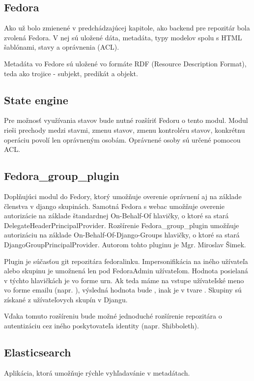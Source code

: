 \documentclass[thesis=M,slovak]{FITthesis}[2013/05/06]
\begin{document}
\subsection{Fedora}
Ako už bolo zmienené v predchádzajúcej kapitole, ako backend pre repozitár bola zvolená Fedora. V nej sú uložené dáta, metadáta, typy modelov spolu s HTML šablónami, stavy a oprávnenia (ACL).

Metadáta vo Fedore sú uložené vo formáte RDF (Resource Description Format), teda ako trojice - subjekt, predikát a objekt.

\subsection{State engine}
Pre možnosť využívania stavov bude nutné rozšíriť Fedoru o tento modul. Modul rieši prechody medzi stavmi, zmenu stavov, zmenu kontroléru stavov, konkrétnu operáciu povolí len oprávneným osobám. Oprávnené osoby sú určené pomocou ACL.

\subsection{Fedora\_group\_plugin}
Doplňujúci modul do Fedory, ktorý umožňuje overenie oprávnení aj na základe členstva v django skupinách. Samotná Fedora s webac umožňuje overenie autorizácie na základe štandardnej On-Behalf-Of hlavičky, o ktoré sa stará DelegateHeaderPrincipalProvider. Rozšírenie Fedora\_group\_plugin umožňuje autorizáciu na základe On-Behalf-Of-Django-Groups hlavičky, o ktoré sa stará DjangoGroupPrincipalProvider. Autorom tohto pluginu je Mgr. Miroslav Šimek. 

Plugin je súčasťou git repozitára fedoralinku. Impersonifikácia na iného užívateľa alebo skupinu je umožnená len pod FedoraAdmin užívateľom. Hodnota posielaná v týchto hlavičkách je vo forme urn.
Ak teda máme na vstupe užívateľské meno vo forme emailu (napr. ), výsledná hodnota bude , inak je v tvare . 
Skupiny sú získané z užívateľovych skupín v Djangu.

Vďaka tomuto rozšíreniu bude možné jednoduché rozšírenie repozitára o autentizáciu cez iného poskytovateľa identity (napr. Shibboleth).

\subsection{Elasticsearch}
Aplikácia, ktorá umožňuje rýchle vyhľadavánie v metadátach.
\end{document}
